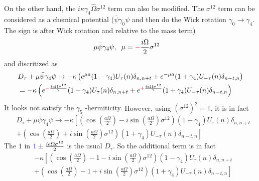 On the other hand, the $i\kappa \gamma _4 \hat{\Omega} \sigma ^{12}$ term can also be modified. The $\sigma ^{12}$ term can be considered as a chemical potential ($\bar{\psi}\gamma _0 \psi$ and then do the Wick rotation $\gamma _0\to \gamma _4$. The sign is after Wick rotation and relative to the mass term)
\begin{equation}
\begin{split}
&\mu  \bar{\psi} \gamma _4 \psi,\;\;\mu = \textcolor[rgb]{1,0,0}{-}\frac{i\Omega}{2}\sigma ^{12}
\end{split}
\end{equation}
and discritized as
\begin{equation}
\begin{split}
&D_{\tau}+\mu  \bar{\psi} \gamma _4 \psi \to -\kappa \left(e^{\mu a}(1-\gamma _4)U_{\tau}(n)\delta _{n,n+t} + e^{-\mu a}(1+\gamma _4) U_{-\tau}(n)\delta _{n-t,n}\right)\\
&=-\kappa \left(e^{\textcolor[rgb]{1,0,0}{-}\frac{ia\Omega \sigma ^{12}}{2}}(1-\gamma _4)U_{\tau}(n)\delta _{n,n+t} + e^{\textcolor[rgb]{1,0,0}{+}\frac{ia\Omega \sigma ^{12}}{2}}(1+\gamma _4) U_{-\tau}(n)\delta _{n-t,n}\right)
\end{split}
\end{equation}
\textcolor[rgb]{1,0,0}{It looks not satisfy the $\gamma _5$ -hermiticity.} However, using $\left(\sigma ^{12}\right)^2=1$, it is in fact
\begin{equation}
\begin{split}
&D_{\tau}+\mu  \bar{\psi} \gamma _4 \psi \to -\kappa \left[\left(\cos(\frac{a\Omega}{2})-i\sin(\frac{a\Omega}{2})\sigma ^{12}\right)(1-\gamma _4)U_{\tau}(n)\delta _{n,n+t} \right.\\
&\left.+\left(\cos(\frac{a\Omega}{2})+i\sin(\frac{a\Omega}{2})\sigma ^{12}\right)(1+\gamma _4) U_{-\tau}(n)\delta _{n-t,n}\right]
\end{split}
\end{equation}
The $1$ in $\textcolor[rgb]{0,0,1}{1}\pm \frac{ia\Omega \sigma ^{12}}{2}$ is the usual $D_{\tau}$. So the additional term is in fact
\textcolor[rgb]{0,0,1}{
\begin{equation}
\begin{split}
&-\kappa \left[\left(\cos(\frac{a\Omega}{2})-1-i\sin(\frac{a\Omega}{2})\sigma ^{12}\right)(1-\gamma _4)U_{\tau}(n)\delta _{n,n+t} \right.\\
&\left.+\left(\cos(\frac{a\Omega}{2})-1+i\sin(\frac{a\Omega}{2})\sigma ^{12}\right)(1+\gamma _4) U_{-\tau}(n)\delta _{n-t,n}\right]
\end{split}
\end{equation}
}
